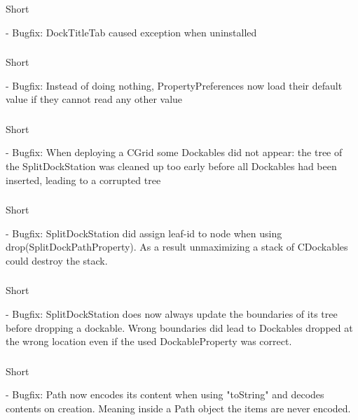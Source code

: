 \documentclass[a4paper,10pt]{article}
\newcommand{\short}{\item[Short]}
\begin{document}
\subsubsection{}
\begin{description}
 \short 
\end{description}
- Bugfix: DockTitleTab caused exception when uninstalled
\subsubsection{}
\begin{description}
 \short 
\end{description}
- Bugfix: Instead of doing nothing, PropertyPreferences now load their default value if they cannot read any other value
\subsubsection{}
\begin{description}
 \short 
\end{description}
- Bugfix: When deploying a CGrid some Dockables did not appear: the tree of the SplitDockStation was cleaned up too early before all Dockables had been inserted, leading to a corrupted tree
\subsubsection{}
\begin{description}
 \short 
\end{description}
- Bugfix: SplitDockStation did assign leaf-id to node when using drop(SplitDockPathProperty). As a result unmaximizing a stack of CDockables could destroy the stack.
\subsubsection{}
\begin{description}
 \short 
\end{description}
- Bugfix: SplitDockStation does now always update the boundaries of its tree before dropping a dockable. Wrong boundaries did lead to Dockables dropped at the wrong location even if the used DockableProperty was correct.
\subsubsection{}
\begin{description}
 \short 
\end{description}
- Bugfix: Path now encodes its content when using "toString" and decodes contents on creation. Meaning inside a Path object the items are never encoded.
\end{document}
